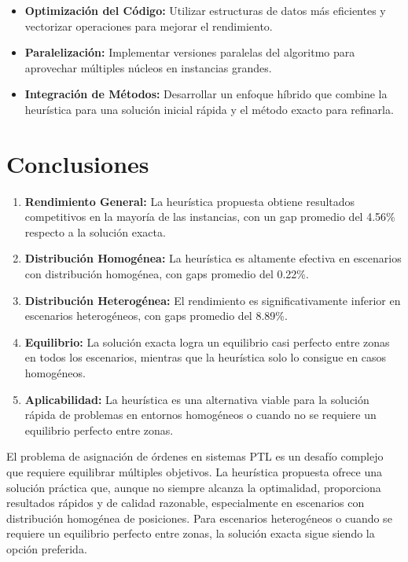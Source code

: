 \documentclass{hw-template}
\begin{document}
\begin{itemize}
    \item \textbf{Optimización del Código:} Utilizar estructuras de datos más eficientes y vectorizar operaciones para mejorar el rendimiento.
    
    \item \textbf{Paralelización:} Implementar versiones paralelas del algoritmo para aprovechar múltiples núcleos en instancias grandes.
    
    \item \textbf{Integración de Métodos:} Desarrollar un enfoque híbrido que combine la heurística para una solución inicial rápida y el método exacto para refinarla.
\end{itemize}
\clearpage
\section{Conclusiones}

\begin{enumerate}
    \item \textbf{Rendimiento General:} La heurística propuesta obtiene resultados competitivos en la mayoría de las instancias, con un gap promedio del 4.56\% respecto a la solución exacta.
    
    \item \textbf{Distribución Homogénea:} La heurística es altamente efectiva en escenarios con distribución homogénea, con gaps promedio del 0.22\%.
    
    \item \textbf{Distribución Heterogénea:} El rendimiento es significativamente inferior en escenarios heterogéneos, con gaps promedio del 8.89\%.
    
    \item \textbf{Equilibrio:} La solución exacta logra un equilibrio casi perfecto entre zonas en todos los escenarios, mientras que la heurística solo lo consigue en casos homogéneos.
    
    \item \textbf{Aplicabilidad:} La heurística es una alternativa viable para la solución rápida de problemas en entornos homogéneos o cuando no se requiere un equilibrio perfecto entre zonas.
\end{enumerate}

El problema de asignación de órdenes en sistemas PTL es un desafío complejo que requiere equilibrar múltiples objetivos. La heurística propuesta ofrece una solución práctica que, aunque no siempre alcanza la optimalidad, proporciona resultados rápidos y de calidad razonable, especialmente en escenarios con distribución homogénea de posiciones. Para escenarios heterogéneos o cuando se requiere un equilibrio perfecto entre zonas, la solución exacta sigue siendo la opción preferida.
\end{document}
